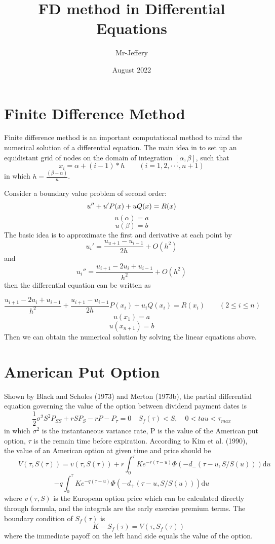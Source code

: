 \documentclass{article}
\title{FD method in Differential Equations}
\author{Mr-Jeffery}
\date{August 2022}
\begin{document}
\maketitle

\section{Finite Difference Method}
Finite difference method is an important computational method to mind the numerical solution of a differential equation. The main idea in to set up an equidistant grid of nodes on the domain of integration $[\alpha,\beta]$, such that 
$$x_i=\alpha+(i-1)*h\qquad(i=1,2,\cdot\cdot\cdot,n+1)$$ 
in which  
$h=\frac{(\beta-\alpha)}n$.

Consider a boundary value problem of second order:
$$u''+u' P(x)+u Q(x)=R(x)\\$$
$$u(\alpha)=a$$
$$u(\beta)=b$$
The basic idea is to approximate the first and derivative at each point by
$$u_i'=\frac{u_{u+1}-u_{i-1}}{2h}+O(h^2)$$
and
$$u_i''=\frac{u_{i+1}-2u_{i}+u_{i-1}}{h^2}+O(h^2)$$
then the differential equation can be written as

$$\frac{u_{i+1}-2u_{i}+u_{i-1}}{h^2}
    +\frac{u_{i+1}-u_{i-1}}{2h} P(x_i)
    +u_i Q(x_i)
    =R(x_i)\qquad(2\le i\le n)$$
$$u(x_1)=a$$
$$u(x_{n+1})=b$$
Then we can obtain the numerical solution by solving the linear equations above.

\section{American Put Option}

Shown by Black and Scholes (1973) and Merton (1973b), the partial differential equation governing the value of the option between dividend payment dates is
$$\frac12 \sigma^2 S^2 P_{SS} + r S P_{S} - r P - P_\tau=0 \quad S_f(\tau)<S,\quad0<tau<\tau_{max}$$
in which $\sigma^2$ is the instantaneous variance rate, P is the value of the American put option, $\tau$ is the remain time before expiration. According to Kim et al. (1990), the value of an American option at given time and price should be 
$$\qquad V(\tau,S(\tau))=v(\tau,S(\tau))+r\int_0^{\tau}K e^{-r(\tau-u)}\Phi(-d_{-}(\tau-u,S/S(u)))\mathrm{d}u$$
$$-q\int_0^{\tau}K e^{-q(\tau-u)}\Phi(-d_{+}(\tau-u,S/S(u)))\mathrm{d}u$$
where $v(\tau,S)$ is the European option price which can be calculated directly through formula, and the integrals are the early exercise premium terms.
The boundary condition of $S_f(\tau)$ is 
$$\qquad K-S_f(\tau)=V(\tau,S_f(\tau))$$
where the immediate payoff on the left hand side equals the value of the option.
\end{document}
